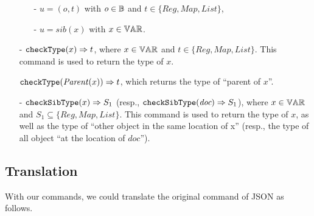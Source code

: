 \begin{itemize}
\begin{itemize}
    \item[-] $u = (o,t)$ with $o \in \mathbb{B}$ and $t \in \{ \mathit{Reg}, \mathit{Map},\mathit{List} \}$,

    \item[-] $u = \mathit{sib}(x)$ with $x \in \mathbb{VAR}$.
    \end{itemize}

\item[-] ${\tt checkType}(x)\Rightarrow t$, where $x \in \mathbb{VAR}$ and $t \in \{ \mathit{Reg}, \mathit{Map},\mathit{List} \}$. This command is used to return the type of $x$.

${\tt checkType}(\mathit{Parent}(x))\Rightarrow t$, which returns the type of ``parent of $x$''.

\item[-] ${\tt checkSibType}(x) \Rightarrow S_1$ (resp., ${\tt checkSibType}(\textit{doc}) \Rightarrow S_1$), where $x \in \mathbb{VAR}$ and $S_1 \subseteq \{ \mathit{Reg}, \mathit{Map},\mathit{List} \}$. This command is used to return the type of $x$, as well as the type of ``other object in the same location of x'' (resp., the type of all object ``at the location of $\textit{doc}$'').
\end{itemize}



\subsection{Translation}
\label{subsec:translation}

With our commands, we could translate the original command of JSON as follows.


